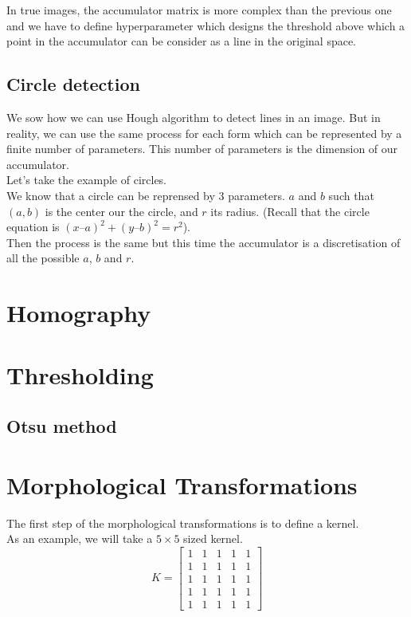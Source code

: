 \documentclass{article}
\begin{document}
In true images, the accumulator matrix is more complex than the previous one and we have to define hyperparameter which designs the threshold above which a point in the accumulator can be consider as a line in the original space.

\subsection{Circle detection}

We sow how we can use Hough algorithm to detect lines in an image. But in reality, we can use the same process for each form which can be represented by a finite number of parameters. This number of parameters is the dimension of our accumulator. \\
Let's take the example of circles.\\
We know that a circle can be reprensed by $3$ parameters. $a$ and $b$ such that $(a, b)$ is the center our the circle, and $r$ its radius. (Recall that the circle equation is $(x – a)^2 + (y – b)^2 = r^2$).\\
Then the process is the same but this time the accumulator is a discretisation of all the possible $a$, $b$ and $r$.


\section{Homography}

\section{Thresholding}

\subsection{Otsu method}

\section{Morphological Transformations}

The first step of the morphological transformations is to define a kernel.\\
As an example, we will take a $5 \times 5$ sized kernel.
$$K = \begin{bmatrix} 1 & 1 & 1 & 1 & 1 \\ 1 & 1 & 1 & 1 & 1 \\1 & 1 & 1 & 1 & 1 \\1 & 1 & 1 & 1 & 1 \\1 & 1 & 1 & 1 & 1  \end{bmatrix}$$
\end{document}
